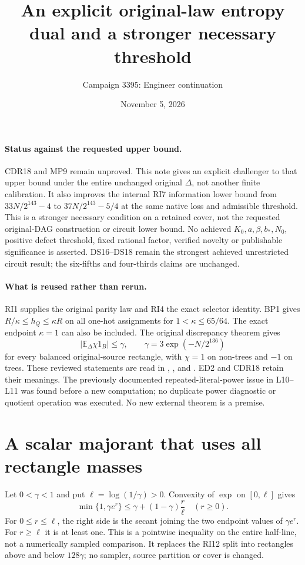 \documentclass[11pt]{article}
\title{An explicit original-law entropy dual and a stronger necessary threshold}
\author{Campaign 3395: Engineer continuation}
\date{November 5, 2026}
\newcommand{\E}{\mathbb E}
\begin{document}
\maketitle

\paragraph{Status against the requested upper bound.}
CDR18 and MP9 remain unproved. This note gives an explicit challenger
to that upper bound under the entire unchanged original $\Delta$,
not another finite calibration. It also improves the internal RI7
information lower bound from $33N/2^{143}-4$ to
$37N/2^{143}-5/4$ at the same native loss and admissible threshold.
This is a stronger necessary condition on a retained cover, not
the requested original-DAG construction or circuit lower bound.
No achieved $K_0,a,\beta,b_*,N_0$, positive defect threshold, fixed
rational factor, verified novelty or publishable significance is
asserted. DS16--DS18 remain the strongest achieved unrestricted
circuit result; the six-fifths and four-thirds claims are unchanged.

\paragraph{What is reused rather than rerun.}
RI1 supplies the original parity law and RI4 the exact selector
identity. BP1 gives $R/\kappa\le h_Q\le\kappa R$ on all one-hot
assignments for $1<\kappa\le65/64$. The exact endpoint $\kappa=1$
can also be included. The original discrepancy theorem gives
\[
 |\E_\Delta\chi1_B|\le\gamma,\qquad
 \gamma=3\exp(-N/2^{136})
\]
for every balanced original-source rectangle, with
$\chi=1$ on non-trees and $-1$ on trees.
These reviewed statements are read in
,
, and
.
ED2 and CDR18 retain their meanings.
The previously documented repeated-literal-power issue in L10--L11
was found before a new computation; no duplicate power diagnostic
or quotient operation was executed.
No new external theorem is a premise.

\section{A scalar majorant that uses all rectangle masses}
Let $0<\gamma<1$ and put $\ell=\log(1/\gamma)>0$.
Convexity of $\exp$ on $[0,\ell]$ gives
\[
 \min\{1,\gamma e^r\}
       \le \gamma+(1-\gamma)\frac r\ell
                         \quad(r\ge0).               \tag{SD1}
\]
For $0\le r\le\ell$, the right side is the secant joining the
two endpoint values of $\gamma e^r$.
For $r\ge\ell$ it is at least one.
This is a pointwise inequality on the entire half-line, not a
numerically sampled comparison.
It replaces the RI12 split into rectangles above and below
$128\gamma$; no sampler, source partition or cover is changed.
\end{document}
